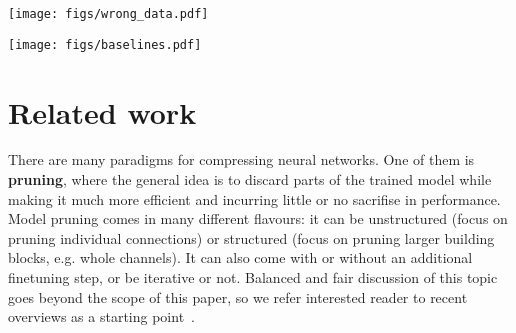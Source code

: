 \documentclass[10pt,twocolumn,letterpaper]{article}
\begin{document}
\begin{figure*}[t]
    \centering
    \vspace{2em}
    \begin{minipage}{0.67\textwidth}
        \centering
        \texttt{[image: figs/wrong\_data.pdf]}
        \label{fig:wrong_data}
    \end{minipage}
    \quad
    \begin{minipage}{0.268\textwidth}
        \centering
        \vspace{-3.81em}
        \texttt{[image: figs/baselines.pdf]}\vspace{-3mm}\label{fig:imagenet_baselines}\end{minipage}
\end{figure*}


\section{Related work}\label{sec:relatedwork}


There are many paradigms for compressing neural networks. One of them is \textbf{pruning}, where the general idea is to discard parts of the trained model while making it much more efficient and incurring little or no sacrifise in performance. Model pruning comes in many different flavours: it can be unstructured (\ie focus on pruning individual connections) or structured (\ie focus on pruning larger building blocks, e.g. whole channels). It can also come with or without an additional finetuning step, or be iterative or not. Balanced and fair discussion of this topic goes beyond the scope of this paper, so we refer interested reader to recent overviews as a starting point~\cite{blalock2020state,wang2021emerging}.
\end{document}
